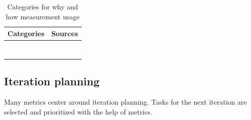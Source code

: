 \documentclass{sig-alternate}
\begin{document}
\begin{table}
\centering
\caption{Categories for why and how measurement usage}
\begin{tabular}{|c|p{}|} \hline
\textbf{Categories}&\textbf{Sources}\\ \hline
 \nameref{IterationPlanning}&
 \cite{Elssamadisy2002617}\cite{Polk2011263}\cite{Cheng200929}\cite{Greening2010}\cite{Hong2010310}
 \cite{Mahnic201273}\cite{Haugen200623}\cite{Hodgkins2007194}\\
 \hline \nameref{IterationTracking} & \cite{Petersen2011975}\cite{Talby2006100}\cite{Mahnic201273}
\cite{Dubinsky200512}\cite{Hong2010310}\cite{LNBIP01490121}\cite{Green2011}\cite{Elssamadisy2002617}\cite{Middleton2007387}
\cite{Trapa2006243}\cite{Trimble20134826}
\newline
\cite{Hodgetts2004106}\cite{Staron20101069}\cite{Seikola2011321}\cite{Polk2011263}\cite{Greening2010}\\
\hline \nameref{Motivate} &
\cite{Trapa2006243}\cite{Talby200940}\cite{Jakobsen2011168}\cite{LNBIP01490121}\cite{Cheng200929}
\cite{Polk2011263}\cite{Staron20101069}\cite{Talby2006100}\\
\hline \nameref{ProblemIdentification} &
\cite{Petersen2011975}\cite{Trapa2006243}\cite{Middleton2007387}\cite{Jakobsen2011168}\cite{Staron20101069}
\cite{Mahnic201273}\cite{Petersen2010654}\cite{Shen200725}\cite{Mujtaba2010139}\cite{Tudor2006367}\\
\hline \nameref{PreQuality} &
\cite{Cataldo2011161}\cite{Janus20129}\cite{Janus20129}\cite{Dubinsky200512}\cite{Trapa2006243}\\
\hline \nameref{PostQuality} &
\cite{Petersen2010654}\cite{Cheng200929}\cite{Green2011}\cite{Staron20101069}\\
\hline \nameref{ChangesInProcesses} &
\cite{Jakobsen2011168}\cite{Petersen2011975}\cite{Mujtaba2010139}\cite{LNBIP01490121}\cite{Staron20101069}
\cite{Janus20129}\\
\hline


\end{tabular}
\end{table}



\subsection{Iteration planning}
\label{IterationPlanning}
Many metrics center around iteration planning. Tasks for the next iteration are
selected and prioritized with the help of metrics.
\end{document}
